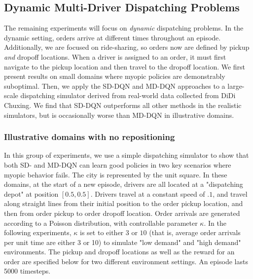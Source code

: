 \subsection{Dynamic Multi-Driver Dispatching Problems}

The remaining experiments will focus on {\em dynamic} dispatching problems. In the dynamic setting, orders arrive at different times throughout an episode. Additionally, we are focused on ride-sharing, so orders now are defined by pickup {\em and} dropoff locations. When a driver is assigned to an order, it must first navigate to the pickup location and then travel to the dropoff location. We first present results on small domains where myopic policies are demonstrably suboptimal. Then, we apply the SD-DQN and MD-DQN approaches to a large-scale dispatching simulator derived from real-world data collected from DiDi Chuxing. We find that SD-DQN outperforms all other methods in the realistic simulators, but is occasionally worse than MD-DQN in illustrative domains. 

\subsubsection{Illustrative domains with no repositioning}

In this group of experiments, we use a simple dispatching simulator to show that both SD- and MD-DQN can learn good policies in two key scenarios where myopic behavior fails. The city is represented by the unit square. In these domains, at the start of a new episode, drivers are all located at a "dispatching depot" at position $[0.5, 0.5]$. Drivers travel at a constant speed of $.1$, and travel along straight lines from their initial position to the order pickup location, and then from order pickup to order dropoff location. Order arrivals are generated according to a Poisson distribution, with controllable parameter $\kappa$. In the following experiments, $\kappa$ is set to either $3$ or $10$ (that is, average order arrivals per unit time are either 3 or 10) to simulate "low demand" and "high demand" environments. The pickup and dropoff locations as well as the reward for an order are specified below for two different environment settings. An episode lasts 5000 timesteps.

